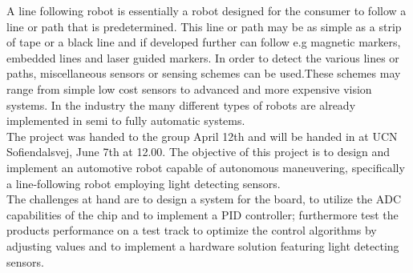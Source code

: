 A line following robot is essentially a robot designed for the consumer to follow a line or path that is predetermined. This line or path may be as simple as a strip of tape or a black line and if  developed further can follow e.g magnetic markers, embedded lines and laser guided markers. In order to detect the various lines or paths, miscellaneous sensors or sensing schemes can be used.\newline These schemes may range from simple low cost sensors to advanced and more expensive vision systems. In the industry the many different types of robots are already implemented in semi to fully automatic systems.\\

The project was handed to the group April 12th and will be handed in at UCN Sofiendalsvej, June 7th at 12.00.\newline
The objective of this project is to design and implement an automotive robot capable of autonomous maneuvering, specifically a line-following robot employing light detecting sensors.  \\
The challenges at hand are to design a system for the board, to utilize the ADC capabilities of the chip and to implement a PID controller; furthermore test the products performance on a test track to optimize the control algorithms by adjusting values and to implement a hardware solution featuring light detecting sensors.